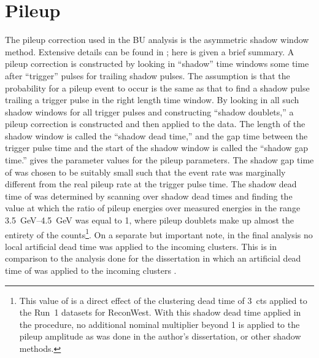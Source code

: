 
\graphicspath{{Body/Figures/Pileup/}{Body/Figures/Pileup/Amplitude/}{Body/Figures/Pileup/TimeShift/}{Body/Figures/Pileup/EnergyModel/}{Body/Figures/Pileup/TriplePileup/}{Body/Figures/Pileup/RateError/}}

\clearpage
\section{Pileup}

The pileup correction used in the BU analysis is the asymmetric shadow window method. Extensive details can be found in ; here is given a brief summary. A pileup correction is constructed by looking in ``shadow'' time windows some time after ``trigger'' pulses for trailing shadow pulses. The assumption is that the probability for a pileup event to occur is the same as that to find a shadow pulse trailing a trigger pulse in the right length time window. By looking in all such shadow windows for all trigger pulses and constructing ``shadow doublets,'' a pileup correction is constructed and then applied to the data. The length of the shadow window is called the ``shadow dead time,'' and the gap time between the trigger pulse time and the start of the shadow window is called the ``shadow gap time.''   gives the parameter values for the pileup parameters. The shadow gap time of  was chosen to be suitably small such that the event rate was marginally different from the real pileup rate at the trigger pulse time. The shadow dead time of  was determined by scanning over shadow dead times and finding the value at which the ratio of pileup energies over measured energies in the range \SIrange{3.5}{4.5}{\GeV} was equal to 1, where pileup doublets make up almost the entirety of the counts\footnote{This value of  is a direct effect of the clustering dead time of 3~cts applied to the Run~1 datasets for ReconWest. With this shadow dead time applied in the procedure, no additional nominal multiplier beyond 1 is applied to the pileup amplitude as was done in the author's dissertation, or other shadow methods.}. On a separate but important note, in the final analysis no local artificial dead time was applied to the incoming clusters. This is in comparison to the analysis done for the dissertation in which an artificial dead time of  was applied to the incoming clusters \cite{phdthesis:2020Kinnaird}.


